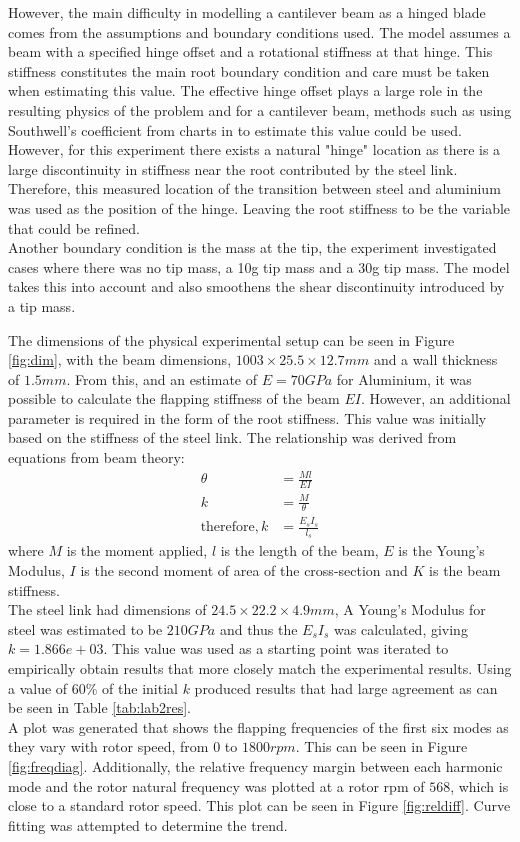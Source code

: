 \documentclass[11pt]{article}
\begin{document}
However, the main difficulty in modelling a cantilever beam as a hinged blade comes from the assumptions and boundary conditions used. The model assumes a beam with a specified hinge offset and a rotational stiffness at that hinge. This stiffness constitutes the main root boundary condition and care must be taken when estimating this value. The effective hinge offset plays a large role in the resulting physics of the problem and for a cantilever beam, methods such as using Southwell's coefficient from charts in \cite{charts} to estimate this value could be used. However, for this experiment there exists a natural "hinge" location as there is a large discontinuity in stiffness near the root contributed by the steel link. Therefore, this measured location of the transition between steel and aluminium was used as the position of the hinge. Leaving the root stiffness to be the variable that could be refined.\\ Another boundary condition is the mass at the tip, the experiment investigated cases where there was no tip mass, a 10g tip mass and a 30g tip mass. The model takes this into account and also smoothens the shear discontinuity introduced by a tip mass.

The dimensions of the physical experimental setup can be seen in Figure \ref{fig:dim}, with the beam dimensions, $1003 \times 25.5 \times 12.7 mm$ and a wall thickness of $1.5 mm$. From this, and an estimate of $E=70GPa$ for Aluminium, it was possible to calculate the flapping stiffness of the beam $EI$. However, an additional parameter is required in the form of the root stiffness. This value was initially based on the stiffness of the steel link. The relationship was derived from equations from beam theory:
\begin{align}
    \theta&=\frac{Ml}{EI}\\
    k&=\frac{M}{\theta}\\
    \text{therefore}, k&=\frac{E_s I_s}{l_s}
\end{align}{}
where $M$ is the moment applied, $l$ is the length of the beam, $E$ is the Young's Modulus, $I$ is the second moment of area of the cross-section and $K$ is the beam stiffness.\\
The steel link had dimensions of $24.5 \times 22.2 \times 4.9 mm$, A Young's Modulus for steel was estimated to be $210GPa$ and thus the $E_s I_s$ was calculated, giving $k=1.866e+03$. This value was used as a starting point was iterated to empirically obtain results that more closely match the experimental results. Using a value of $60\%$ of the initial $k$ produced results that had large agreement as can be seen in Table \ref{tab:lab2res}.\\
A plot was generated that shows the flapping frequencies of the first six modes as they vary with rotor speed, from $0$ to $1800 rpm$. This can be seen in Figure \ref{fig:freqdiag}. Additionally, the relative frequency margin between each harmonic mode  and the rotor natural frequency was plotted at a rotor rpm of $568$, which is close to a standard rotor speed. This plot can be seen in Figure \ref{fig:reldiff}. Curve fitting was attempted to determine the trend.
\end{document}
